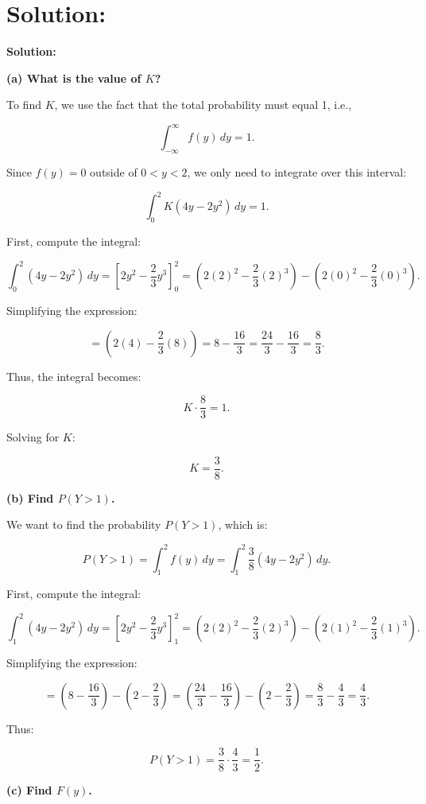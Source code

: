 \documentclass{article}
\begin{document}
\section*{Solution:}

\textbf{Solution:}

\textbf{(a) What is the value of \( K \)?}

To find \( K \), we use the fact that the total probability must equal 1, i.e.,

\[
\int_{-\infty}^{\infty} f(y) \, dy = 1.
\]

Since \( f(y) = 0 \) outside of \( 0 < y < 2 \), we only need to integrate over this interval:

\[
\int_0^2 K(4y - 2y^2) \, dy = 1.
\]

First, compute the integral:

\[
\int_0^2 (4y - 2y^2) \, dy = \left[ 2y^2 - \frac{2}{3}y^3 \right]_0^2 = \left(2(2)^2 - \frac{2}{3}(2)^3\right) - \left(2(0)^2 - \frac{2}{3}(0)^3\right).
\]

Simplifying the expression:

\[
= \left(2(4) - \frac{2}{3}(8)\right) = 8 - \frac{16}{3} = \frac{24}{3} - \frac{16}{3} = \frac{8}{3}.
\]

Thus, the integral becomes:

\[
K \cdot \frac{8}{3} = 1.
\]

Solving for \( K \):

\[
K = \frac{3}{8}.
\]

\textbf{(b) Find \( P(Y > 1) \).}

We want to find the probability \( P(Y > 1) \), which is:

\[
P(Y > 1) = \int_1^2 f(y) \, dy = \int_1^2 \frac{3}{8}(4y - 2y^2) \, dy.
\]

First, compute the integral:

\[
\int_1^2 (4y - 2y^2) \, dy = \left[ 2y^2 - \frac{2}{3}y^3 \right]_1^2 = \left(2(2)^2 - \frac{2}{3}(2)^3\right) - \left(2(1)^2 - \frac{2}{3}(1)^3\right).
\]

Simplifying the expression:

\[
= \left(8 - \frac{16}{3}\right) - \left(2 - \frac{2}{3}\right) = \left(\frac{24}{3} - \frac{16}{3}\right) - \left(2 - \frac{2}{3}\right) = \frac{8}{3} - \frac{4}{3} = \frac{4}{3}.
\]

Thus:

\[
P(Y > 1) = \frac{3}{8} \cdot \frac{4}{3} = \frac{1}{2}.
\]

\textbf{(c) Find \( F(y) \).}
\end{document}
